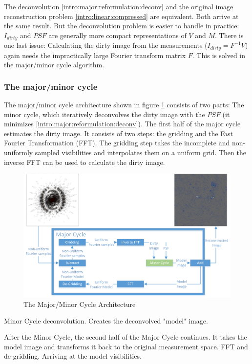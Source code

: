 The deconvolution \eqref{intro:major:reformulation:deconv} and the original image reconstruction problem \eqref{intro:linear:compressed} are equivalent. Both arrive at the same result. But the deconvolution problem is easier to handle in practice: $I_{dirty}$ and $PSF$ are generally more compact representations of $V$ and $M$. There is one last issue: Calculating the dirty image from the measurements ($I_{dirty} = F^{-1}V$) again needs the impractically large Fourier transform matrix $F$. This is solved in the major/minor cycle algorithm.

\subsubsection{The major/minor cycle}
The major/minor cycle architecture shown in figure \ref{intro:major:fig} consists of two parts: The minor cycle, which iteratively deconvolves the dirty image with the $PSF$ (it minimizes \eqref{intro:major:reformulation:deconv}). The first half of the major cycle estimates the dirty image. It consists of two steps: the gridding and the Fast Fourier Transformation (FFT). The gridding step takes the incomplete and non-uniformly sampled visibilities and interpolates them on a uniform grid. Then the inverse FFT can be used to calculate the dirty image.

\begin{figure}[h]
	\centering
	\includegraphics[width=0.90\linewidth]{./chapters/02.hypo/Major-Minor3.png}
	\caption{The Major/Minor Cycle Architecture}
	\label{intro:major:fig}
\end{figure}

Minor Cycle deconvolution. Creates the deconvolved "model" image.

After the Minor Cycle, the second half of the Major Cycle continues. It takes the model image and transforms it back to the original measurement space. FFT and de-gridding. Arriving at the model visibilities.

